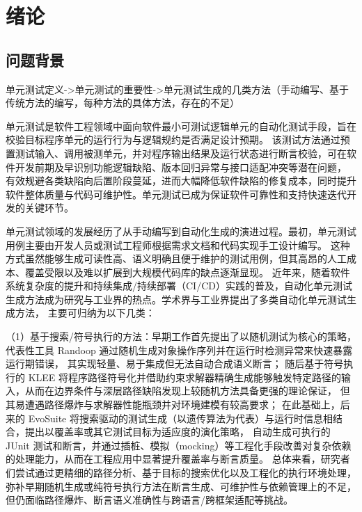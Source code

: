 \cleardoublepage

\section{绪论}

\subsection{问题背景}
单元测试定义->单元测试的重要性->单元测试生成的几类方法（手动编写、基于传统方法的编写，每种方法的具体方法，存在的不足）

单元测试是软件工程领域中面向软件最小可测试逻辑单元的自动化测试手段，旨在校验目标程序单元的运行行为与逻辑规约是否满足设计预期。
该测试方法通过预置测试输入、调用被测单元，并对程序输出结果及运行状态进行断言校验，可在软件开发前期及早识别功能逻辑缺陷、版本回归异常与接口适配冲突等潜在问题，
有效规避各类缺陷向后置阶段蔓延，进而大幅降低软件缺陷的修复成本，同时提升软件整体质量与代码可维护性。单元测试已成为保证软件可靠性和支持快速迭代开发的关键环节。

单元测试领域的发展经历了从手动编写到自动化生成的演进过程。最初，单元测试用例主要由开发人员或测试工程师根据需求文档和代码实现手工设计编写。
这种方式虽然能够生成可读性高、语义明确且便于维护的测试用例，但其高昂的人工成本、覆盖受限以及难以扩展到大规模代码库的缺点逐渐显现。
近年来，随着软件系统复杂度的提升和持续集成/持续部署（CI/CD）实践的普及，自动化单元测试生成方法成为研究与工业界的热点。学术界与工业界提出了多类自动化单元测试生成方法，
主要可归纳为以下几类：

（1）基于搜索/符号执行的方法：早期工作首先提出了以随机测试为核心的策略，代表性工具 Randoop 通过随机生成对象操作序列并在运行时检测异常来快速暴露运行期错误，
其实现轻量、易于集成但无法自动合成语义断言；
随后基于符号执行的 KLEE 将程序路径符号化并借助约束求解器精确生成能够触发特定路径的输入，从而在边界条件与深层路径缺陷发现上较随机方法具备更强的理论保证，
但其易遭遇路径爆炸与求解器性能瓶颈并对环境建模有较高要求；
在此基础上，后来的 EvoSuite 将搜索驱动的测试生成（以遗传算法为代表）与运行时信息相结合，提出以覆盖率或其它测试目标为适应度的演化策略，
自动生成可执行的 JUnit 测试和断言，并通过插桩、模拟（mocking）等工程化手段改善对复杂依赖的处理能力，从而在工程应用中显著提升覆盖率与断言质量。
总体来看，研究者们尝试通过更精细的路径分析、基于目标的搜索优化以及工程化的执行环境处理，
弥补早期随机生成或纯符号执行方法在断言生成、可维护性与依赖管理上的不足，但仍面临路径爆炸、断言语义准确性与跨语言/跨框架适配等挑战。

